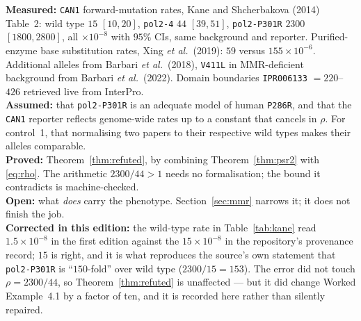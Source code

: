 \begin{ledger}
\textbf{Measured:} \texttt{CAN1} forward-mutation rates, Kane and Shcherbakova
(2014) Table~2: wild type $15$ $[10,20]$, \texttt{pol2-4} $44$ $[39,51]$,
\texttt{pol2-P301R} $2300$ $[1800,2800]$, all $\times10^{-8}$ with $95\%$ CIs,
same background and reporter. Purified-enzyme base
substitution rates, Xing \emph{et al.}\ (2019): $59$ versus $155 \times 10^{-6}$.
Additional alleles from Barbari \emph{et al.}\ (2018), \texttt{V411L} in
MMR-deficient background from Barbari \emph{et al.}\ (2022). Domain boundaries
\texttt{IPR006133} $= 220$--$426$ retrieved live from InterPro. \\
\textbf{Assumed:} that \texttt{pol2-P301R} is an adequate model of human
\texttt{P286R}, and that the \texttt{CAN1} reporter reflects genome-wide rates up
to a constant that cancels in $\rho$. For control~1, that normalising two papers
to their respective wild types makes their alleles comparable. \\
\textbf{Proved:} Theorem~\ref{thm:refuted}, by combining Theorem~\ref{thm:psr2}
with \eqref{eq:rho}. The arithmetic $2300/44 > 1$ needs no formalisation; the
bound it contradicts is machine-checked. \\
\textbf{Open:} what \emph{does} carry the phenotype. Section~\ref{sec:mmr}
narrows it; it does not finish the job. \\
\textbf{Corrected in this edition:} the wild-type rate in Table~\ref{tab:kane}
read $1.5\times10^{-8}$ in the first edition against the $15\times10^{-8}$ in the
repository's provenance record; $15$ is right, and it is what reproduces the
source's own statement that \texttt{pol2-P301R} is ``$150$-fold'' over wild type
($2300/15 = 153$). The error did not touch $\rho = 2300/44$, so
Theorem~\ref{thm:refuted} is unaffected --- but it did change
Worked Example~4.1 by a factor of ten, and it is recorded here rather than
silently repaired.
\end{ledger}
